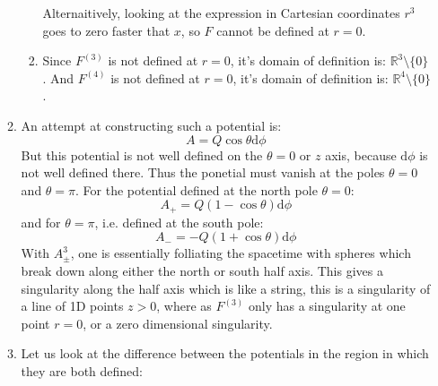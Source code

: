 \documentclass[12pt,a4]{article}
\newcommand{\e}{\mathrm{d}}
\begin{document}
\begin{enumerate}
\begin{enumerate}
\begin{enumerate}
            Alternaitively, looking at the expression in Cartesian coordinates $r^3$ goes to zero faster that $x$, so $F$ cannot be defined at $r = 0$.
          \item
            Since $F^{(3)}$ is not defined at $r = 0$, it's domain of definition is: $\mathbb{R}^3 \setminus \{0\}$.
            And $F^{(4)}$ is not defined at $r = 0$, it's domain of definition is: $\mathbb{R}^4 \setminus \{0\}$.
        \end{enumerate}
      \item
        An attempt at constructing such a potential is:
        \begin{equation*}
          A = Q \cos \theta \e \phi
        \end{equation*}
        But this potential is not well defined on the $\theta = 0$ or $z$ axis, because $\e \phi$ is not well defined there.
        Thus the ponetial must vanish at the poles $\theta = 0$ and $\theta = \pi$.
        For the potential defined at the north pole $\theta = 0$:
        \begin{equation*}
          A_+ = Q (1 - \cos \theta) \e \phi
        \end{equation*}
        and for $\theta = \pi$, i.e. defined at the south pole:
        \begin{equation*}
          A_- = -Q (1 + \cos \theta) \e \phi
        \end{equation*}
        With $A^{3}_{\pm}$, one is essentially folliating the spacetime with spheres which break down along either the north or south half axis.
        This gives a singularity along the half axis which is like a string, this is a singularity of a line of 1D points $z > 0$, where as $F^{(3)}$ only has a singularity at one point $r = 0$, or a zero dimensional singularity.
      \item
        Let us look at the difference between the potentials in the region in which they are both defined:

\end{enumerate}
\end{enumerate}
\end{document}
